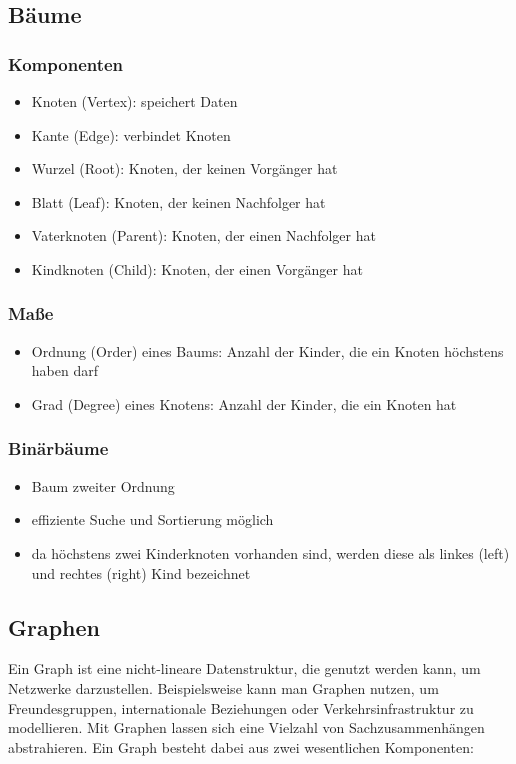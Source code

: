 \documentclass{article}
\begin{document}
	\subsection{Bäume}
	
	\subsubsection{Komponenten}
	
	\begin{itemize}
		\item Knoten (Vertex): speichert Daten
		\item Kante (Edge): verbindet Knoten
		\item Wurzel (Root): Knoten, der keinen Vorgänger hat
		\item Blatt (Leaf): Knoten, der keinen Nachfolger hat
		\item Vaterknoten (Parent): Knoten, der einen Nachfolger hat
		\item Kindknoten (Child): Knoten, der einen Vorgänger hat
	\end{itemize}
	
	\subsubsection{Maße}
	
	\begin{itemize}
		\item Ordnung (Order) eines Baums: Anzahl der Kinder, die ein Knoten höchstens haben darf
		\item Grad (Degree) eines Knotens: Anzahl der Kinder, die ein Knoten hat
	\end{itemize}
	
	\subsubsection{Binärbäume}
	
	\begin{itemize}
		\item Baum zweiter Ordnung
		\item effiziente Suche und Sortierung möglich
		\item da höchstens zwei Kinderknoten vorhanden sind, werden diese als linkes (left) und rechtes (right) Kind bezeichnet
	\end{itemize}

	\subsection{Graphen}
	Ein Graph ist eine nicht-lineare Datenstruktur, die genutzt werden kann, um Netzwerke darzustellen. Beispielsweise kann man Graphen nutzen, um Freundesgruppen, internationale Beziehungen oder Verkehrsinfrastruktur zu modellieren. Mit Graphen lassen sich eine Vielzahl von Sachzusammenhängen abstrahieren.
	Ein Graph besteht dabei aus zwei wesentlichen Komponenten:
\end{document}
